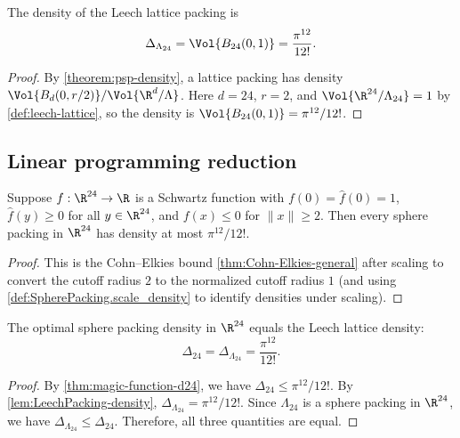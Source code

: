 \begin{lemma}\label{lem:LeechPacking-density}\leanok
  The density of the Leech lattice packing is
  \[
    \Delta_{\Lambda_{24}} = \Vol{B_{24}(0,1)} = \frac{\pi^{12}}{12!}.
  \]
\end{lemma}
\begin{proof}\leanok
  By \cref{theorem:psp-density}, a lattice packing has density $\Vol{B_d(0,r/2)}/\Vol{\R^d/\Lambda}$.
  Here $d=24$, $r=2$, and $\Vol{\R^{24}/\Lambda_{24}}=1$ by \cref{def:leech-lattice}, so the density is $\Vol{B_{24}(0,1)}=\pi^{12}/12!$.
\end{proof}

\subsection{Linear programming reduction}

\begin{theorem}\label{thm:LP-d24}\leanok
  Suppose $f:\R^{24}\to\R$ is a Schwartz function with $f(0)=\widehat f(0)=1$, $\widehat f(y)\ge 0$ for all $y\in\R^{24}$, and $f(x)\le 0$ for $\|x\|\ge 2$.
  Then every sphere packing in $\R^{24}$ has density at most $\pi^{12}/12!$.
\end{theorem}
\begin{proof}\leanok
  This is the Cohn--Elkies bound \cref{thm:Cohn-Elkies-general} after scaling to convert the cutoff radius $2$ to the normalized cutoff radius $1$ (and using \cref{def:SpherePacking.scale_density} to identify densities under scaling).
\end{proof}

\begin{theorem}\label{thm:SpherePackingConstant_eq_leech_density}\leanok
  The optimal sphere packing density in $\R^{24}$ equals the Leech lattice density:
  \[
    \Delta_{24} = \Delta_{\Lambda_{24}} = \frac{\pi^{12}}{12!}.
  \]
\end{theorem}
\begin{proof}\leanok
  By \cref{thm:magic-function-d24}, we have $\Delta_{24}\le \pi^{12}/12!$.
  By \cref{lem:LeechPacking-density}, $\Delta_{\Lambda_{24}}=\pi^{12}/12!$.
  Since $\Lambda_{24}$ is a sphere packing in $\R^{24}$, we have $\Delta_{\Lambda_{24}}\le \Delta_{24}$.
  Therefore, all three quantities are equal.
\end{proof}

